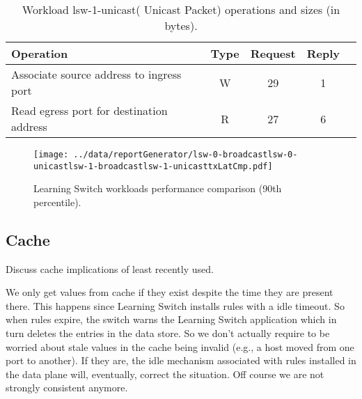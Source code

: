\begin{table}[ht]
\centering 
\begin{tabular}{l c c c c}
 Operation & Type & Request & Reply \\ \toprule 
Associate source address to ingress port & W & 29 & 1\\\midrule
Read egress port for destination address & R & 27 & 6 \\\bottomrule
\end{tabular}
\caption[Workload lsw-1-unicast( Unicast Packet) operations]{Workload lsw-1-unicast( Unicast Packet) operations and sizes (in bytes).}
\label{table:lsw1:unicast}
\end{table}

\begin{figure}[ht]
\centering
\texttt{[image: ../data/reportGenerator/lsw-0-broadcastlsw-0-unicastlsw-1-broadcastlsw-1-unicasttxLatCmp.pdf]}
\caption[Learning Switch workloads performance comparison]{Learning Switch workloads performance comparison (90th percentile). }
\end{figure}
\subsection{Cache}

\label{sec.learning.switch.lru.cache} Discuss cache implications of
least recently used. 

We only get values from cache if they exist despite the time they are
present there. This happens since Learning Switch installs rules with
a idle timeout. So when rules expire, the switch warns the Learning
Switch application which in turn deletes the entries in the data
store. So we don't actually require to be worried about stale values
in the cache being invalid (e.g., a host moved from one port to
another). If they are, the idle mechanism associated with rules
installed in the data plane will, eventually, correct the situation.
Off course we are not strongly consistent anymore. 

